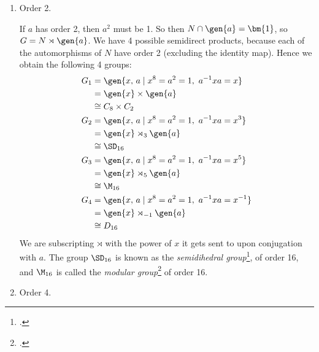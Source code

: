\begin{enumerate}
    \item Order 2.

        If \(a\) has order 2, then \(a^2\) must be 1.
        So then \(N \cap \gen{a} = \bm{1}\), so \(G = N \rtimes \gen{a}\).
        We have 4 possible semidirect products, because each of the automorphisms of \(N\) have order 2 (excluding the
        identity map).
        Hence we obtain the following 4 groups:
        \begin{equation*}
        \begin{aligned}
            G_1 &= \gen{x,\,a \mid x^8 = a^2 = 1,\ a^{-1}xa = x} \\
                &= \gen{x} \times \gen{a} \\
                &\cong C_8 \times C_2 \\
            G_2 &= \gen{x,\,a \mid x^8 = a^2 = 1,\ a^{-1}xa = x^{3}} \\
                &= \gen{x} \rtimes_3 \gen{a} \\
                &\cong \SD_{16}\\
            G_3 &= \gen{x,\,a \mid x^8 = a^2 = 1,\ a^{-1}xa = x^{5}} \\
                &= \gen{x} \rtimes_5 \gen{a} \\
                &\cong \M_{16}\\
            G_4 &= \gen{x,\,a \mid x^8 = a^2 = 1,\ a^{-1}xa = x^{-1}} \\
                &= \gen{x} \rtimes_{-1} \gen{a} \\
                &\cong D_{16}
        \end{aligned}
        \end{equation*}
        We are subscripting \(\rtimes\) with the power of \(x\) it gets sent to upon conjugation with \(a\).
        The group \(\SD_{16}\) is known as the \emph{semidihedral group}\footcite{semidihedral}, of order 16, and
        \(\M_{16}\) is called the \emph{modular group}\footcite{order16names} of order 16.

    \item Order 4.


\end{enumerate}
